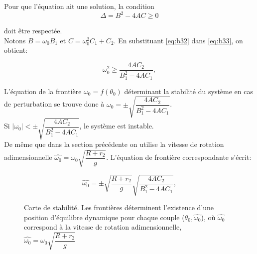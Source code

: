 Pour que l'équation ait une solution, la condition 
\begin{equation}
    \Delta=B^2-4AC \geq 0
\label{eq:b33}
\end{equation}

doit être respectée.\\
Notons $B=\omega_0 B_1$ et $C=\omega_0^2 C_1 + C_2$.
En substituant \ref{eq:b32} dans \ref{eq:b33}, on obtient:

\begin{equation}
    \omega_0^2\geq \frac{4AC_2}{B_1^2-4AC_1},
\end{equation}

L'équation de la frontière $\omega_0=f(\theta_0)$ déterminant la stabilité du système en cas de perturbation se trouve donc à $\omega_0 =\pm \sqrt{\dfrac{4AC_2}{B_1^2-4AC_1}}$.\\
Si $|\omega_0|< \pm \sqrt{\dfrac{4AC_2}{B_1^2-4AC_1}}$, le système est instable.
\\
De même que dans la section précédente on utilise la vitesse de rotation adimensionnelle $\hat{\omega_0}=\omega_0 \sqrt{\dfrac{R+r_2}{g}}$. L'équation de frontière correspondante s'écrit: 

\begin{equation}
    \hat{\omega_0} =\pm \sqrt{\frac{R+r_2}{g}} \sqrt{\frac{4AC_2}{B_1^2-4AC_1}},
\end{equation}



\begin{figure}[h]
\def\svgwidth{250}

\def\svgwidth{250}

\caption{Carte de stabilité. Les frontières déterminent l'existence d'une position d'équilibre dynamique pour chaque couple ($\theta_0,\hat{\omega_0}$), où $\hat{\omega_0}$ correspond à la vitesse de rotation adimensionnelle, $\hat{\omega_0}=\omega_0 \sqrt{\dfrac{R+r_2}{g}}$}
\end{figure}

